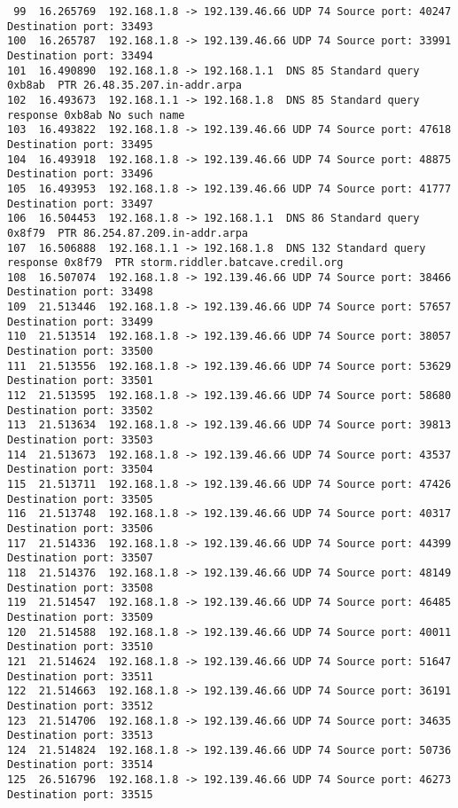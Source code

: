 \documentclass[a4paper]{report} %
\begin{document}
\begin{lstlisting}
 99  16.265769  192.168.1.8 -> 192.139.46.66 UDP 74 Source port: 40247  Destination port: 33493
100  16.265787  192.168.1.8 -> 192.139.46.66 UDP 74 Source port: 33991  Destination port: 33494
101  16.490890  192.168.1.8 -> 192.168.1.1  DNS 85 Standard query 0xb8ab  PTR 26.48.35.207.in-addr.arpa
102  16.493673  192.168.1.1 -> 192.168.1.8  DNS 85 Standard query response 0xb8ab No such name
103  16.493822  192.168.1.8 -> 192.139.46.66 UDP 74 Source port: 47618  Destination port: 33495
104  16.493918  192.168.1.8 -> 192.139.46.66 UDP 74 Source port: 48875  Destination port: 33496
105  16.493953  192.168.1.8 -> 192.139.46.66 UDP 74 Source port: 41777  Destination port: 33497
106  16.504453  192.168.1.8 -> 192.168.1.1  DNS 86 Standard query 0x8f79  PTR 86.254.87.209.in-addr.arpa
107  16.506888  192.168.1.1 -> 192.168.1.8  DNS 132 Standard query response 0x8f79  PTR storm.riddler.batcave.credil.org
108  16.507074  192.168.1.8 -> 192.139.46.66 UDP 74 Source port: 38466  Destination port: 33498
109  21.513446  192.168.1.8 -> 192.139.46.66 UDP 74 Source port: 57657  Destination port: 33499
110  21.513514  192.168.1.8 -> 192.139.46.66 UDP 74 Source port: 38057  Destination port: 33500
111  21.513556  192.168.1.8 -> 192.139.46.66 UDP 74 Source port: 53629  Destination port: 33501
112  21.513595  192.168.1.8 -> 192.139.46.66 UDP 74 Source port: 58680  Destination port: 33502
113  21.513634  192.168.1.8 -> 192.139.46.66 UDP 74 Source port: 39813  Destination port: 33503
114  21.513673  192.168.1.8 -> 192.139.46.66 UDP 74 Source port: 43537  Destination port: 33504
115  21.513711  192.168.1.8 -> 192.139.46.66 UDP 74 Source port: 47426  Destination port: 33505
116  21.513748  192.168.1.8 -> 192.139.46.66 UDP 74 Source port: 40317  Destination port: 33506
117  21.514336  192.168.1.8 -> 192.139.46.66 UDP 74 Source port: 44399  Destination port: 33507
118  21.514376  192.168.1.8 -> 192.139.46.66 UDP 74 Source port: 48149  Destination port: 33508
119  21.514547  192.168.1.8 -> 192.139.46.66 UDP 74 Source port: 46485  Destination port: 33509
120  21.514588  192.168.1.8 -> 192.139.46.66 UDP 74 Source port: 40011  Destination port: 33510
121  21.514624  192.168.1.8 -> 192.139.46.66 UDP 74 Source port: 51647  Destination port: 33511
122  21.514663  192.168.1.8 -> 192.139.46.66 UDP 74 Source port: 36191  Destination port: 33512
123  21.514706  192.168.1.8 -> 192.139.46.66 UDP 74 Source port: 34635  Destination port: 33513
124  21.514824  192.168.1.8 -> 192.139.46.66 UDP 74 Source port: 50736  Destination port: 33514
125  26.516796  192.168.1.8 -> 192.139.46.66 UDP 74 Source port: 46273  Destination port: 33515

\end{lstlisting}
\end{document}
